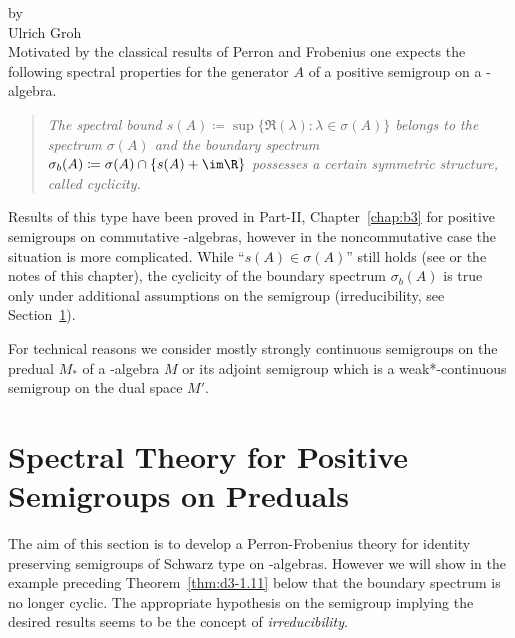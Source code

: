 \setcounter{section}{0}
\label{chap:d3}
\thispagestyle{empty}
{\Large
\vspace*{-.75cm}
by \\[.25em]
Ulrich Groh
\vspace{.75cm}
\\
}
Motivated by the classical results of Perron and Frobenius one expects the following spectral properties for the generator $A$ of a positive semigroup on a \CA-algebra.
\begin{quote}
\textit{The spectral bound 
$s(A) \coloneqq \sup\{\Re(\lambda) \colon \lambda \in \sigma(A)\}$ belongs to the spectrum $\sigma(A)$ and the boundary spectrum
$  %
\sigma_{b}(A) \coloneqq \sigma(A) \cap \{s(A)+\im\R\}
$  %
possesses a certain symmetric structure, called cyclicity.}
\end{quote}
Results of this type have been proved in Part-II, Chapter~\ref{chap:b3} for positive semigroups on commutative \CA-algebras, however in the noncommutative case the situation is more complicated.
While \enquote{$s(A) \in \sigma(A)$} still holds (see \textcite{greinervoigtwolff:1981} or the notes of this chapter), the cyclicity of the boundary spectrum $\sigma_{b}(A)$ is true only under additional assumptions on the semigroup (\eg irreducibility, see Section~\ref{sec:d3-1}).

For technical reasons we consider mostly strongly continuous semigroups on the predual $M_{*}$ of a \WA-algebra $M$ or its adjoint semigroup which is a weak*-continuous semigroup on the dual space $M'$.
\section{Spectral Theory for Positive Semigroups on Preduals}\label{sec:d3-1}
The aim of this section is to develop a Perron-Frobenius theory for identity preserving semigroups of Schwarz type on \WA-algebras.
However we will show in the example preceding Theorem~\ref{thm:d3-1.11} below that the boundary spectrum is no longer cyclic.
The appropriate hypothesis on the semigroup implying the desired results seems to be the concept of \emph{irreducibility}.

